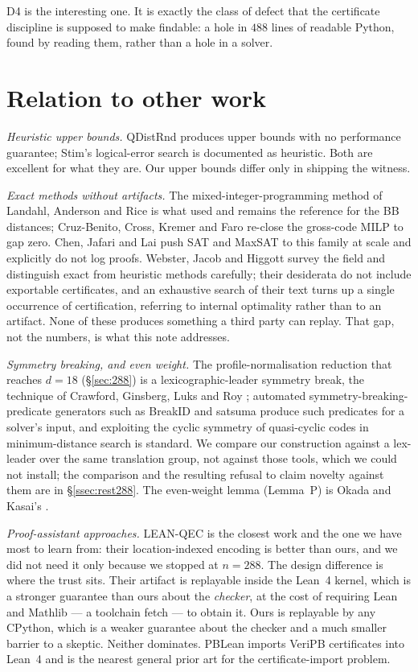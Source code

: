 \documentclass[11pt]{amsart}
\theoremstyle{plain}
\theoremstyle{definition}
\theoremstyle{remark}
\begin{document}
\smallskip
\noindent D4 is the interesting one. It is exactly the class of defect that the
certificate discipline is supposed to make findable: a hole in $488$ lines of
readable Python, found by reading them, rather than a hole in a solver.

\section{Relation to other work}\label{sec:related}

\emph{Heuristic upper bounds.} QDistRnd \cite{QDistRnd} produces upper bounds
with no performance guarantee; Stim's logical-error search \cite{Stim} is
documented as heuristic. Both are excellent for what they are. Our upper
bounds differ only in shipping the witness.

\emph{Exact methods without artifacts.} The mixed-integer-programming method
of Landahl, Anderson and Rice \cite{LandahlAndersonRice} is what
\cite{BCGMRY} used and remains the reference for the BB distances;
Cruz-Benito, Cross, Kremer and Faro \cite{CruzBenito} re-close the gross-code
MILP to gap zero. Chen, Jafari and Lai \cite{ChenJafariLai} push SAT and
MaxSAT to this family at scale and explicitly do not log proofs. Webster, Jacob and Higgott \cite{WJH}
survey the field and distinguish exact from heuristic methods carefully; their
desiderata do not include exportable certificates, and an exhaustive search of
their text turns up a single occurrence of certification, referring to
internal optimality rather than to an artifact. None of these produces
something a third party can replay. That gap, not the numbers, is what this
note addresses.

\emph{Symmetry breaking, and even weight.} The profile-normalisation reduction
that reaches $d=18$ (\S\ref{sec:288}) is a lexicographic-leader symmetry break,
the technique of Crawford, Ginsberg, Luks and Roy \cite{CGLR}; automated
symmetry-breaking-predicate generators such as BreakID \cite{BreakID} and
satsuma \cite{satsuma} produce such predicates for a solver's input, and
exploiting the cyclic symmetry of quasi-cyclic codes in minimum-distance search
is standard. We compare our construction against a lex-leader over the same
translation group, not against those tools, which we could not install; the
comparison and the resulting refusal to claim novelty against them are in
\S\ref{ssec:rest288}. The even-weight lemma (Lemma~P) is Okada and Kasai's
\cite{OkadaKasai}.

\emph{Proof-assistant approaches.} LEAN-QEC \cite{LeanQEC} is the closest work
and the one we have most to learn from: their location-indexed encoding is
better than ours, and we did not need it only because we stopped at $n=288$.
The design difference is where the trust sits. Their artifact is replayable
inside the Lean~4 kernel, which is a stronger guarantee than ours about the
\emph{checker}, at the cost of requiring Lean and Mathlib --- a toolchain fetch
--- to obtain it. Ours is replayable by any CPython, which is a weaker
guarantee about the checker and a much smaller barrier to a skeptic. Neither
dominates. PBLean \cite{PBLean} imports VeriPB certificates into Lean~4 and is
the nearest general prior art for the certificate-import problem.
\end{document}
